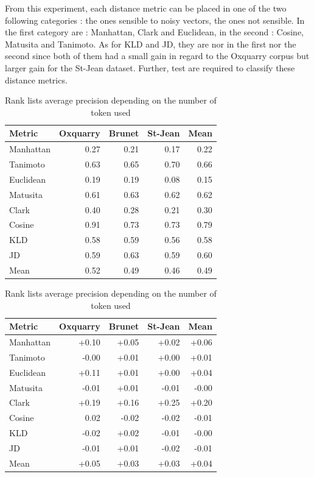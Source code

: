 From this experiment, each distance metric can be placed in one of the two following categories : the ones sensible to noisy vectors, the ones not sensible.
In the first category are : Manhattan, Clark and Euclidean, in the second : Cosine, Matusita and Tanimoto.
As for KLD and JD, they are nor in the first nor the second since both of them had a small gain in regard to the Oxquarry corpus but larger gain for the St-Jean dataset.
Further, test are required to classify these distance metrics.


\begin{table}
  \centering
  \caption{Rank lists average precision depending on the number of token used}

  \label{tab:baseline_every_token}
  \begin{tabular}{l r r r|r}
    \toprule
    Metric & Oxquarry & Brunet & St-Jean & Mean \\
    \midrule
    Manhattan & 0.27 & 0.21 & 0.17 & 0.22 \\
    Tanimoto  & 0.63 & 0.65 & 0.70 & 0.66 \\
    Euclidean & 0.19 & 0.19 & 0.08 & 0.15 \\
    Matusita  & 0.61 & 0.63 & 0.62 & 0.62 \\
    Clark     & 0.40 & 0.28 & 0.21 & 0.30 \\
    Cosine    & 0.91 & 0.73 & 0.73 & 0.79 \\
    KLD       & 0.58 & 0.59 & 0.56 & 0.58 \\
    JD        & 0.59 & 0.63 & 0.59 & 0.60 \\
    \midrule
    Mean      & 0.52 & 0.49 & 0.46 & 0.49 \\
    \bottomrule
  \end{tabular}

  \label{tab:gain_without_hapax_legomena}
  \begin{tabular}{l r r r|r}
    \toprule
    Metric & Oxquarry & Brunet & St-Jean & Mean \\
    \midrule
    Manhattan & +0.10 & +0.05 & +0.02 & +0.06 \\
    Tanimoto  & -0.00 & +0.01 & +0.00 & +0.01 \\
    Euclidean & +0.11 & +0.01 & +0.00 & +0.04 \\
    Matusita  & -0.01 & +0.01 & -0.01 & -0.00 \\
    Clark     & +0.19 & +0.16 & +0.25 & +0.20 \\
    Cosine    &  0.02 & -0.02 & -0.02 & -0.01 \\
    KLD       & -0.02 & +0.02 & -0.01 & -0.00 \\
    JD        & -0.01 & +0.01 & -0.02 & -0.01 \\
    \midrule
    Mean      & +0.05 & +0.03 & +0.03 & +0.04 \\
    \bottomrule
  \end{tabular}


\end{table}

